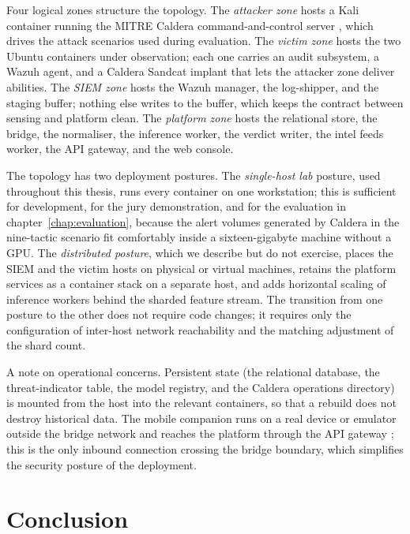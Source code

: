Four logical zones structure the topology. The \emph{attacker zone}
hosts a Kali container running the MITRE Caldera command-and-control
server \cite{caldera2024}, which drives the attack scenarios used
during evaluation. The \emph{victim zone} hosts the two Ubuntu
containers under observation; each one carries an audit subsystem, a
Wazuh agent, and a Caldera Sandcat implant that lets the attacker
zone deliver abilities. The \emph{SIEM zone} hosts the Wazuh manager,
the log-shipper, and the staging buffer; nothing else writes to the
buffer, which keeps the contract between sensing and platform clean.
The \emph{platform zone} hosts the relational store, the bridge, the
normaliser, the inference worker, the verdict writer, the intel
feeds worker, the API gateway, and the web console.

The topology has two deployment postures. The \emph{single-host
lab} posture, used throughout this thesis, runs every container on
one workstation; this is sufficient for development, for the jury
demonstration, and for the evaluation in chapter~\ref{chap:evaluation},
because the alert volumes generated by Caldera in the nine-tactic
scenario fit comfortably inside a sixteen-gigabyte machine without a
GPU. The \emph{distributed posture}, which we describe but do not
exercise, places the SIEM and the victim hosts on physical or virtual
machines, retains the platform services as a container stack on a
separate host, and adds horizontal scaling of inference workers
behind the sharded feature stream. The transition from one posture to
the other does not require code changes; it requires only the
configuration of inter-host network reachability and the matching
adjustment of the shard count.

A note on operational concerns. Persistent state (the relational
database, the threat-indicator table, the model registry, and the
Caldera operations directory) is mounted from the host into the
relevant containers, so that a rebuild does not destroy historical
data. The mobile companion runs on a real device or emulator outside
the bridge network and reaches the platform through the API gateway
\cite{expo2024,nextjs2024}; this is the only inbound connection
crossing the bridge boundary, which simplifies the security posture
of the deployment.
\section{Conclusion}
